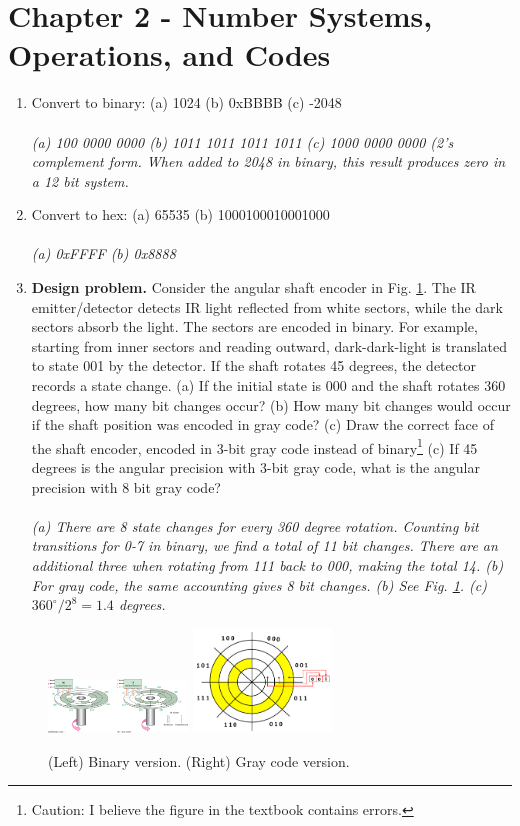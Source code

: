 \documentclass[10pt]{article}
\begin{document}
\section{Chapter 2 - Number Systems, Operations, and Codes}

\begin{enumerate}
\item Convert to binary: (a) 1024 (b) 0xBBBB (c) -2048 \\ \\
\textit{(a) 100 0000 0000 (b) 1011 1011 1011 1011 (c) 1000 0000 0000 (2's complement form.  When added to 2048 in binary, this result produces zero in a 12 bit system.}
\item Convert to hex: (a) 65535 (b) 1000100010001000 \\ \\
\textit{(a) 0xFFFF (b) 0x8888}
\item \textbf{Design problem.}  Consider the angular shaft encoder in Fig. \ref{fig:grayCode}.  The IR emitter/detector detects IR light reflected from white sectors, while the dark sectors absorb the light.  The sectors are encoded in binary.  For example, starting from inner sectors and reading outward, dark-dark-light is translated to state 001 by the detector.  If the shaft rotates 45 degrees, the detector records a state change.  (a) If the initial state is 000 and the shaft rotates 360 degrees, how many bit changes occur?  (b) How many bit changes would occur if the shaft position was encoded in gray code?  (c) Draw the correct face of the shaft encoder, encoded in 3-bit gray code instead of binary\footnote{Caution: I believe the figure in the textbook contains errors.} (c) If 45 degrees is the angular precision with 3-bit gray code, what is the angular precision with 8 bit gray code? \\ \\
\textit{(a) There are 8 state changes for every 360 degree rotation. Counting bit transitions for 0-7 in binary, we find a total of 11 bit changes.  There are an additional three when rotating from 111 back to 000, making the total 14. (b) For gray code, the same accounting gives 8 bit changes. (b) See Fig. \ref{fig:grayCode}. 
 (c) $360^{\circ}/2^8 = 1.4$ degrees.}
\end{enumerate}
\begin{figure}[hb]
\centering
\includegraphics[width=0.33\textwidth,trim=0cm 0cm 12cm 0cm,clip=true]{gray_code_shaft.jpg}
\includegraphics[width=0.33\textwidth]{Encoding_Disk_Gray.png}
\caption{\label{fig:grayCode} (Left) Binary version. (Right) Gray code version.}
\end{figure}
\end{document}

